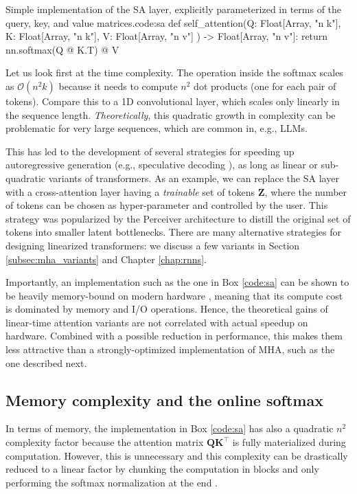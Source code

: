 \begin{mypy}{Simple implementation of the SA layer, explicitly parameterized in terms of the query, key, and value matrices.}{code:sa}
def self_attention(Q: Float[Array, "n k"], 
                   K: Float[Array, "n k"], 
                   V: Float[Array, "n v"]
                 ) -> Float[Array, "n v"]:
	return nn.softmax(Q @ K.T) @ V
\end{mypy}

Let us look first at the time complexity. The operation inside the softmax scales as $\mathcal{O}(n^2k)$ because it needs to compute $n^2$ dot products (one for each pair of tokens). Compare this to a 1D convolutional layer, which scales only linearly in the sequence length. \textit{Theoretically}, this quadratic growth in complexity can be problematic for very large sequences, which are common in, e.g., LLMs. 

This has led to the development of several strategies for speeding up autoregressive generation (e.g., speculative decoding \cite{leviathan2023fast}), as long as linear or sub-quadratic variants of transformers. As an example, we can replace the SA layer with a cross-attention layer having a \textit{trainable} set of tokens $\mathbf{Z}$, where the number of tokens can be chosen as hyper-parameter and controlled by the user. This strategy was popularized by the Perceiver architecture \cite{jaegle2021perceiver} to distill the original set of tokens into smaller latent bottlenecks. There are many alternative strategies for designing linearized transformers: we discuss a few  variants in Section \ref{subsec:mha_variants} and Chapter \ref{chap:rnns}.

Importantly, an implementation such as the one in Box \ref{code:sa} can be shown to be heavily memory-bound on modern hardware \cite{dao2022flashattention}, meaning that its compute cost is dominated by memory and I/O operations. Hence, the theoretical gains of linear-time attention variants are not correlated with actual speedup on hardware. Combined with a possible reduction in performance, this makes them less attractive than a strongly-optimized implementation of MHA, such as the one described next.

\subsection{Memory complexity and the online softmax}

In terms of memory, the implementation in Box \ref{code:sa} has also a quadratic $n^2$ complexity factor because the attention matrix $\mathbf{Q}\mathbf{K}^\top$ is fully materialized during computation. However, this is unnecessary and this complexity can be drastically reduced to a linear factor by chunking the computation in blocks and only performing the softmax normalization at the end \cite{rabe2021self}. 

